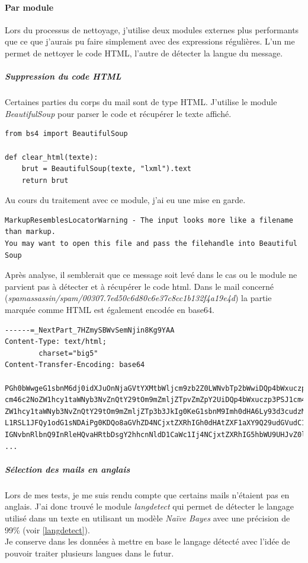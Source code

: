 		\paragraph{Par module}
			Lors du processus de nettoyage, j'utilise deux modules externes plus performants que ce que j'aurais pu faire simplement avec des expressions régulières.
            L'un me permet de nettoyer le code HTML, l'autre de détecter la langue du message.

			\subparagraph{Suppression du code HTML}
				Certaines parties du corps du mail sont de type HTML\@.
                J'utilise le module \emph{BeautifulSoup} pour parser le code et récupérer le texte affiché.

			    \begin{lstlisting}[title=Nettoyage des nombres,label={lst:clear_html}]
from bs4 import BeautifulSoup

def clear_html(texte):
    brut = BeautifulSoup(texte, "lxml").text
    return brut
                \end{lstlisting}
            Au cours du traitement avec ce module, j'ai eu une mise en garde.
            \begin{verbatim}
MarkupResemblesLocatorWarning - The input looks more like a filename than markup.
You may want to open this file and pass the filehandle into Beautiful Soup
            \end{verbatim}
            Après analyse, il semblerait que ce message soit levé dans le cas ou le module ne parvient pas à détecter et à récupérer le code html.
            Dans le mail concerné \\(\emph{spamassassin/spam/00307.7ed50c6d80c6e37c8cc1b132f4a19e4d}) la partie marquée comme HTML est également encodée en base64.
            \begin{verbatim}
------=_NextPart_7HZmySBWvSemNjin8Kg9YAA
Content-Type: text/html;
        charset="big5"
Content-Transfer-Encoding: base64

PGh0bWwgeG1sbnM6dj0idXJuOnNjaGVtYXMtbWljcm9zb2Z0LWNvbTp2bWwiDQp4bWxuczpvPSJ1
cm46c2NoZW1hcy1taWNyb3NvZnQtY29tOm9mZmljZTpvZmZpY2UiDQp4bWxuczp3PSJ1cm46c2No
ZW1hcy1taWNyb3NvZnQtY29tOm9mZmljZTp3b3JkIg0KeG1sbnM9Imh0dHA6Ly93d3cudzMub3Jn
L1RSL1JFQy1odG1sNDAiPg0KDQo8aGVhZD4NCjxtZXRhIGh0dHAtZXF1aXY9Q29udGVudC1UeXBl
IGNvbnRlbnQ9InRleHQvaHRtbDsgY2hhcnNldD1CaWc1Ij4NCjxtZXRhIG5hbWU9UHJvZ0lkIGNv
...         \end{verbatim}

            \subparagraph{Sélection des mails en anglais}
                Lors de mes tests, je me suis rendu compte que certains mails n'étaient pas en anglais.
                J'ai donc trouvé le module \emph{langdetect} qui permet de détecter le langage utilisé dans un texte en utilisant un modèle \emph{Naïve Bayes} avec une précision de 99\% (voir \ref{langdetect}). \\
				Je conserve dans les données à mettre en base le langage détecté avec l'idée de pouvoir traiter plusieurs langues dans le futur. \\


